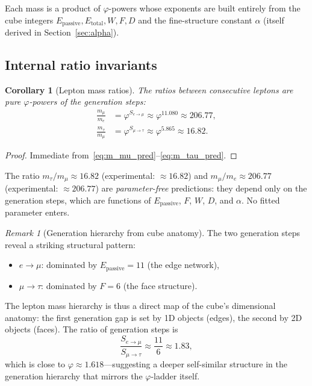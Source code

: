 \documentclass[11pt,a4paper]{article}
\newtheorem{corollary}[theorem]{Corollary}
\theoremstyle{definition}
\theoremstyle{remark}
\newtheorem{remark}[theorem]{Remark}
\newcommand{\phig}{\varphi}
\newcommand{\Epass}{E_{\mathrm{passive}}}
\newcommand{\Etot}{E_{\mathrm{total}}}
\begin{document}
\noindent
Each mass is a product of $\phig$-powers whose exponents are built entirely
from the cube integers $\Epass, \Etot, W, F, D$ and the fine-structure
constant $\alpha$ (itself derived in Section~\ref{sec:alpha}).

\subsection{Internal ratio invariants}

\begin{corollary}[Lepton mass ratios]
\label{cor:lepton_ratios}
The ratios between consecutive leptons are pure $\phig$-powers of the
generation steps:
\begin{align}
  \frac{m_\mu}{m_e} &= \phig^{S_{e\to\mu}} \approx \phig^{11.080}
    \approx 206.77, \label{eq:ratio_mu_e} \\[4pt]
  \frac{m_\tau}{m_\mu} &= \phig^{S_{\mu\to\tau}} \approx \phig^{5.865}
    \approx 16.82. \label{eq:ratio_tau_mu}
\end{align}
\end{corollary}

\begin{proof}
Immediate from~\eqref{eq:m_mu_pred}--\eqref{eq:m_tau_pred}.
\end{proof}

\noindent
The ratio $m_\tau/m_\mu \approx 16.82$ (experimental: $\approx 16.82$) and
$m_\mu/m_e \approx 206.77$ (experimental: $\approx 206.77$) are
\emph{parameter-free} predictions: they depend only on the generation steps,
which are functions of $\Epass$, $F$, $W$, $D$, and $\alpha$.  No fitted
parameter enters.

\begin{remark}[Generation hierarchy from cube anatomy]
\label{rem:gen_hierarchy}
The two generation steps reveal a striking structural pattern:
\begin{itemize}[nosep]
  \item $e \to \mu$: dominated by $\Epass = 11$ (the edge network),
  \item $\mu \to \tau$: dominated by $F = 6$ (the face structure).
\end{itemize}
The lepton mass hierarchy is thus a direct map of the cube's dimensional
anatomy: the first generation gap is set by 1D objects (edges), the second by
2D objects (faces).  The ratio of generation steps is
\[
  \frac{S_{e\to\mu}}{S_{\mu\to\tau}} \approx \frac{11}{6} \approx 1.83,
\]
which is close to $\phig \approx 1.618$---suggesting a deeper self-similar
structure in the generation hierarchy that mirrors the $\phig$-ladder itself.
\end{remark}
\end{document}
